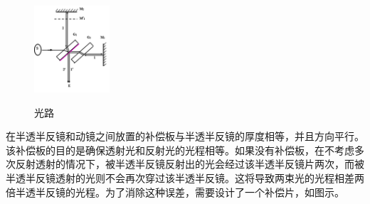 \documentclass{ctexart}
\begin{document}
\begin{figure} %
    \begin{center}
        \vspace{-1cm}
        \includegraphics[width=0.25\textwidth]{./pic/rt.png}
        \label{fig:route}
    \end{center}
    \caption{光路}
\end{figure}
在半透半反镜和动镜之间放置的补偿板与半透半反镜的厚度相等，并且方向平行。该补偿板的目的是确保透射光和反射光的光程相等。如果没有补偿板，在不考虑多次反射透射的情况下，被半透半反镜反射出的光会经过该半透半反镜片两次，而被半透半反镜透射的光则不会再次穿过该半透半反镜。这将导致两束光的光程相差两倍半透半反镜的光程。为了消除这种误差，需要设计了一个补偿片，如图示。
\end{document}
